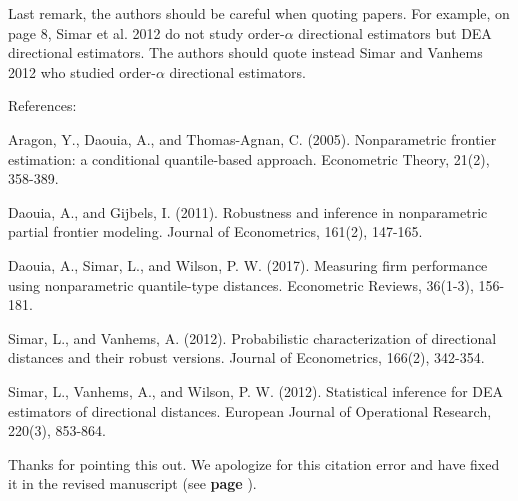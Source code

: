 \documentclass[12pt]{article}
\newcommand{\np}{\vskip 0.3cm}
\begin{document}
\np
\np
\np
\begin{sf}
{\blueb Last remark, the authors should be careful when quoting papers. For example, on page 8, Simar et al. 2012 do not study order-$\alpha$ directional estimators but DEA directional estimators. The authors should quote instead Simar and Vanhems 2012 who studied order-$\alpha$ directional estimators.\np

References: 

Aragon, Y., Daouia, A., and Thomas-Agnan, C. (2005). Nonparametric frontier estimation: a conditional quantile-based approach. Econometric Theory, 21(2), 358-389. \np

Daouia, A., and Gijbels, I. (2011). Robustness and inference in nonparametric partial frontier modeling. Journal of Econometrics, 161(2), 147-165. \np

Daouia, A., Simar, L., and Wilson, P. W. (2017). Measuring firm performance using nonparametric quantile-type distances. Econometric Reviews, 36(1-3), 156-181. \np

Simar, L., and Vanhems, A. (2012). Probabilistic characterization of directional distances and their robust versions. Journal of Econometrics, 166(2), 342-354. \np

Simar, L., Vanhems, A., and Wilson, P. W. (2012). Statistical inference for DEA estimators of directional distances. European Journal of Operational Research, 220(3), 853-864. }
\end{sf}
\begin{response}
Thanks for pointing this out. We apologize for this citation error and have fixed it in the revised manuscript (see \textbf{page }).

\end{response}


 \np
 \np
 \np

\end{document}
